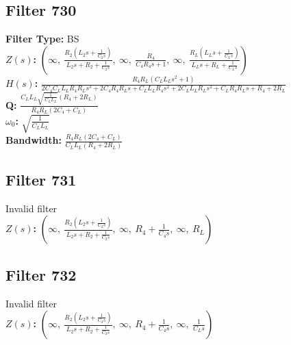 \documentclass{article}
\begin{document}
\subsection*{Filter 730}
\textbf{Filter Type:} BS \\ 
\textbf{$Z(s)$:} $\left( \infty, \  \frac{R_{2} \left(L_{2} s + \frac{1}{C_{2} s}\right)}{L_{2} s + R_{2} + \frac{1}{C_{2} s}}, \  \infty, \  \frac{R_{4}}{C_{4} R_{4} s + 1}, \  \infty, \  \frac{R_{L} \left(L_{L} s + \frac{1}{C_{L} s}\right)}{L_{L} s + R_{L} + \frac{1}{C_{L} s}}\right)$ \\ 
\textbf{$H(s)$:} $\frac{R_{4} R_{L} \left(C_{L} L_{L} s^{2} + 1\right)}{2 C_{4} C_{L} L_{L} R_{4} R_{L} s^{3} + 2 C_{4} R_{4} R_{L} s + C_{L} L_{L} R_{4} s^{2} + 2 C_{L} L_{L} R_{L} s^{2} + C_{L} R_{4} R_{L} s + R_{4} + 2 R_{L}}$ \\ 
\textbf{Q:} $\frac{C_{L} L_{L} \sqrt{\frac{1}{C_{L} L_{L}}} \left(R_{4} + 2 R_{L}\right)}{R_{4} R_{L} \left(2 C_{4} + C_{L}\right)}$ \\ 
\textbf{$\omega_0$:} $\sqrt{\frac{1}{C_{L} L_{L}}}$ \\ 
\textbf{Bandwidth:} $\frac{R_{4} R_{L} \left(2 C_{4} + C_{L}\right)}{C_{L} L_{L} \left(R_{4} + 2 R_{L}\right)}$ \\ 
\subsection*{Filter 731}
Invalid filter \\ 
\textbf{$Z(s)$:} $\left( \infty, \  \frac{R_{2} \left(L_{2} s + \frac{1}{C_{2} s}\right)}{L_{2} s + R_{2} + \frac{1}{C_{2} s}}, \  \infty, \  R_{4} + \frac{1}{C_{4} s}, \  \infty, \  R_{L}\right)$ \\ 
\subsection*{Filter 732}
Invalid filter \\ 
\textbf{$Z(s)$:} $\left( \infty, \  \frac{R_{2} \left(L_{2} s + \frac{1}{C_{2} s}\right)}{L_{2} s + R_{2} + \frac{1}{C_{2} s}}, \  \infty, \  R_{4} + \frac{1}{C_{4} s}, \  \infty, \  \frac{1}{C_{L} s}\right)$ \\ 
\end{document}
